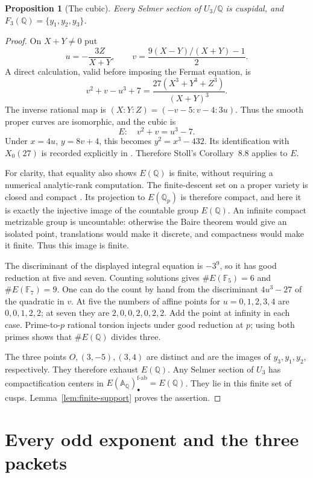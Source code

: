 \documentclass[11pt,a4paper]{article}
\newcommand{\Q}{\mathbb Q}
\newcommand{\F}{\mathbb F}
\newcommand{\A}{\mathbb A}
\newcommand{\fab}{\mathrm{f\text{-}ab}}
\theoremstyle{plain}
\newtheorem{proposition}[theorem]{Proposition}
\theoremstyle{definition}
\begin{document}
\begin{proposition}[The cubic]\label{prop:cubic}
Every Selmer section of $U_3/\Q$ is cuspidal, and
$F_3(\Q)=\{y_1,y_2,y_3\}$.
\end{proposition}
\begin{proof}
On $X+Y\neq0$ put
\[
 u=-\frac{3Z}{X+Y},\qquad
 v=\frac{9(X-Y)/(X+Y)-1}{2}.
\]
A direct calculation, valid before imposing the Fermat equation, is
\begin{equation}\label{eq:cubicidentity}
 v^2+v-u^3+7=
 \frac{27(X^3+Y^3+Z^3)}{(X+Y)^3}.
\end{equation}
The inverse rational map is
$(X:Y:Z)=(-v-5:v-4:3u)$. Thus the smooth proper curves are isomorphic,
and the cubic is
\[
 E:\quad v^2+v=u^3-7.
\]
Under $x=4u$, $y=8v+4$, this becomes $y^2=x^3-432$.
Its identification with $X_0(27)$ is recorded explicitly in
\citet[\S10.1, p.~65]{krizli}. Therefore Stoll's
Corollary~8.8 applies to $E$.

For clarity, that equality also shows $E(\Q)$ is finite, without
requiring a numerical analytic-rank computation. The finite-descent
set on a proper variety is closed and compact
\citep[discussion preceding Definition~5.4, p.~364]{stoll}. Its projection to
$E(\Q_p)$ is therefore compact, and here it is exactly the injective
image of the countable group $E(\Q)$. An infinite compact metrizable
group is uncountable: otherwise the Baire theorem would give an
isolated point, translations would make it discrete, and compactness
would make it finite. Thus this image is finite.

The discriminant of the displayed integral equation is $-3^9$, so
it has good reduction at five and seven. Counting solutions gives
$\#E(\F_5)=6$ and $\#E(\F_7)=9$. One can do the count by hand from
the discriminant $4u^3-27$ of the quadratic in $v$. At five the
numbers of affine points for $u=0,1,2,3,4$ are $0,0,1,2,2$; at seven
they are $2,0,0,2,0,2,2$. Add the point at infinity in each case.
Prime-to-$p$ rational torsion injects under good reduction at $p$;
using both primes shows that $\#E(\Q)$ divides three.

The three points $O,(3,-5),(3,4)$ are distinct and are the images
of $y_3,y_1,y_2$, respectively. They therefore exhaust $E(\Q)$.
Any Selmer section of $U_3$ has compactification centers in
$E(\A_\Q)_\bullet^{\fab}=E(\Q)$. They lie in this finite set of
cusps. Lemma~\ref{lem:finite-support} proves the assertion.
\end{proof}

\section{Every odd exponent and the three packets}\label{sec:allodd}
\end{document}
